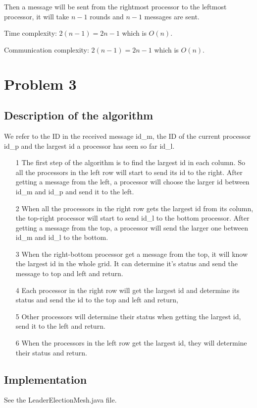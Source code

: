 \documentclass[paper=a4, fontsize=11pt]{scrartcl} %
\numberwithin{equation}{section} %
\numberwithin{figure}{section} %
\numberwithin{table}{section} %
\begin{document}
Then a message will be sent from the rightmost processor to the leftmost processor, it will take $n - 1$ rounds and $n - 1$ messages are sent.

Time complexity: $2(n - 1) = 2n - 1$ which is $O(n)$.

Communication complexity:  $2(n - 1) = 2n - 1$ which is $O(n)$.

\section*{Problem 3}
\subsection*{Description of the algorithm}
 We refer to the ID in the received message id\_m, the ID of the current processor id\_p and the largest id a processor has seen so far id\_l.
\begin{itemize}
	\item[1] The first step of the algorithm is to find the largest id in each column. So all the processors in the left row will start to send its id to the right. After getting a message from the left, a processor will choose the larger id between id\_m and id\_p and send it to the left. 
	\item[2] When all the processors in the right row gets the largest id from its column, the top-right processor will start to send id\_l to the bottom processor. After getting a message from the top, a processor will send the larger one between id\_m and id\_l to the bottom. 
	\item[3] When the right-bottom processor get a message from the top, it will know the largest id in the whole grid. It can determine it's status and send the message to top and left and return. 
	\item[4] Each processor in the right row will get the largest id and determine its status and send the id to the top and left and return,
	\item[5] Other processors will determine their status when getting the largest id, send it to the left and return.
	\item[6] When the processors in the left row get the largest id, they will determine their status and return.
\end{itemize}
\subsection*{Implementation}
See the LeaderElectionMesh.java file.
\end{document}
